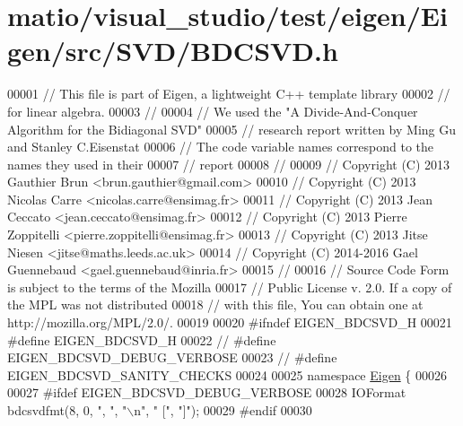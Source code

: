 \hypertarget{matio_2visual__studio_2test_2eigen_2_eigen_2src_2_s_v_d_2_b_d_c_s_v_d_8h_source}{}\section{matio/visual\+\_\+studio/test/eigen/\+Eigen/src/\+S\+V\+D/\+B\+D\+C\+S\+VD.h}
\label{matio_2visual__studio_2test_2eigen_2_eigen_2src_2_s_v_d_2_b_d_c_s_v_d_8h_source}

\begin{DoxyCode}
00001 \textcolor{comment}{// This file is part of Eigen, a lightweight C++ template library}
00002 \textcolor{comment}{// for linear algebra.}
00003 \textcolor{comment}{// }
00004 \textcolor{comment}{// We used the "A Divide-And-Conquer Algorithm for the Bidiagonal SVD"}
00005 \textcolor{comment}{// research report written by Ming Gu and Stanley C.Eisenstat}
00006 \textcolor{comment}{// The code variable names correspond to the names they used in their }
00007 \textcolor{comment}{// report}
00008 \textcolor{comment}{//}
00009 \textcolor{comment}{// Copyright (C) 2013 Gauthier Brun <brun.gauthier@gmail.com>}
00010 \textcolor{comment}{// Copyright (C) 2013 Nicolas Carre <nicolas.carre@ensimag.fr>}
00011 \textcolor{comment}{// Copyright (C) 2013 Jean Ceccato <jean.ceccato@ensimag.fr>}
00012 \textcolor{comment}{// Copyright (C) 2013 Pierre Zoppitelli <pierre.zoppitelli@ensimag.fr>}
00013 \textcolor{comment}{// Copyright (C) 2013 Jitse Niesen <jitse@maths.leeds.ac.uk>}
00014 \textcolor{comment}{// Copyright (C) 2014-2016 Gael Guennebaud <gael.guennebaud@inria.fr>}
00015 \textcolor{comment}{//}
00016 \textcolor{comment}{// Source Code Form is subject to the terms of the Mozilla}
00017 \textcolor{comment}{// Public License v. 2.0. If a copy of the MPL was not distributed}
00018 \textcolor{comment}{// with this file, You can obtain one at http://mozilla.org/MPL/2.0/.}
00019 
00020 \textcolor{preprocessor}{#ifndef EIGEN\_BDCSVD\_H}
00021 \textcolor{preprocessor}{#define EIGEN\_BDCSVD\_H}
00022 \textcolor{comment}{// #define EIGEN\_BDCSVD\_DEBUG\_VERBOSE}
00023 \textcolor{comment}{// #define EIGEN\_BDCSVD\_SANITY\_CHECKS}
00024 
00025 \textcolor{keyword}{namespace }\hyperlink{namespace_eigen}{Eigen} \{
00026 
00027 \textcolor{preprocessor}{#ifdef EIGEN\_BDCSVD\_DEBUG\_VERBOSE}
00028 IOFormat bdcsvdfmt(8, 0, \textcolor{stringliteral}{", "}, \textcolor{stringliteral}{"\(\backslash\)n"}, \textcolor{stringliteral}{"  ["}, \textcolor{stringliteral}{"]"});
00029 \textcolor{preprocessor}{#endif}
00030   

\end{DoxyCode}
